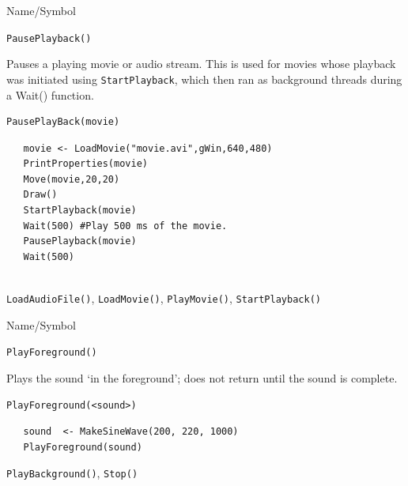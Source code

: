 \vfill
\newpage
{}
\vfill

\begin{desc}{Name/Symbol}
\item[Name/Symbol]	\verb+PausePlayback()+
 
\item[Description] Pauses a playing movie or audio stream.  This is used for 
movies whose playback was initiated using \verb+StartPlayback+, which then ran as
background threads during a Wait() function. 

\item[Usage]		
\begin{verbatim}
PausePlayBack(movie)
\end{verbatim}

\item[Example]	
\begin{verbatim}
   movie <- LoadMovie("movie.avi",gWin,640,480)
   PrintProperties(movie)
   Move(movie,20,20)
   Draw() 
   StartPlayback(movie)
   Wait(500) #Play 500 ms of the movie.
   PausePlayback(movie)
   Wait(500)
   
\end{verbatim}

\item[See Also] \verb+LoadAudioFile()+, \verb+LoadMovie()+, \verb+PlayMovie()+, \verb+StartPlayback()+
\end{desc}




\begin{desc}{Name/Symbol}
\item[Name/Symbol]	\verb+PlayForeground()+  

\item[Description]	Plays the sound `in the foreground'; 
		does not return until the sound is complete.

\item[Usage]		
\begin{verbatim}
PlayForeground(<sound>)
\end{verbatim}

\item[Example]	
\begin{verbatim}
   sound  <- MakeSineWave(200, 220, 1000)
   PlayForeground(sound)
\end{verbatim}
\item[See Also]	\verb+PlayBackground()+, \verb+Stop()+
\end{desc}

